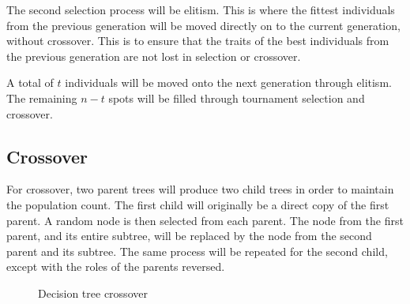 \documentclass[12pt]{article}
\begin{document}
The second selection process will be elitism. This is where the fittest individuals from the previous generation will be moved directly on to the current generation, without crossover. This is to ensure that the traits of the best individuals from the previous generation are not lost in selection or crossover.

A total of $t$ individuals will be moved onto the next generation through elitism. The remaining $n - t$ spots will be filled through tournament selection and crossover.

\subsection{Crossover}

For crossover, two parent trees will produce two child trees in order to maintain the population count. The first child will originally be a direct copy of the first parent. A random node is then selected from each parent. The node from the first parent, and its entire subtree, will be replaced by the node from the second parent and its subtree. The same process will be repeated for the second child, except with the roles of the parents reversed.

\begin{figure}[H]
    \centering
    \caption{Decision tree crossover}
    \label{fig:treecrossover}
\end{figure}
\end{document}
